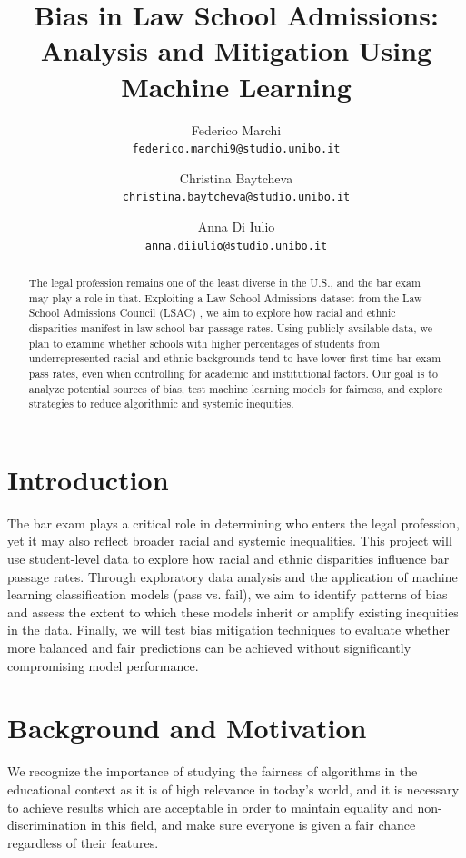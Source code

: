 \documentclass{article}
\title{Bias in Law School Admissions: Analysis and Mitigation Using Machine Learning}
\author{
  Federico Marchi\\
  \texttt{federico.marchi9@studio.unibo.it}
  \and
  Christina Baytcheva\\
  \texttt{christina.baytcheva@studio.unibo.it}
  \and
  Anna Di Iulio\\
  \texttt{anna.diiulio@studio.unibo.it}
}
\begin{document}
\maketitle

\begin{abstract}
The legal profession remains one of the least diverse in the U.S., and the bar exam may play a role in that. Exploiting a Law School Admissions dataset from the Law School Admissions Council (LSAC) \cite{lsacdata}, we aim to explore how racial and ethnic disparities manifest in law school bar passage rates. Using publicly available data, we plan to examine whether schools with higher percentages of students from underrepresented racial and ethnic backgrounds tend to have lower first-time bar exam pass rates, even when controlling for academic and institutional factors. Our goal is to analyze potential sources of bias, test machine learning models for fairness, and explore strategies to reduce algorithmic and systemic inequities.

\end{abstract}

\section{Introduction}

The bar exam plays a critical role in determining who enters the legal profession, yet it may also reflect broader racial and systemic inequalities. This project will use student-level data to explore how racial and ethnic disparities influence bar passage rates. Through exploratory data analysis and the application of machine learning classification models (pass vs. fail), we aim to identify patterns of bias and assess the extent to which these models inherit or amplify existing inequities in the data. Finally, we will test bias mitigation techniques to evaluate whether more balanced and fair predictions can be achieved without significantly compromising model performance.

\section{Background and Motivation}
We recognize the importance of studying the fairness of algorithms in the educational context as it is of high relevance in today's world, and it is necessary to achieve results which are acceptable in order to maintain equality and non-discrimination in this field, and make sure everyone is given a fair chance regardless of their features. 
\end{document}
